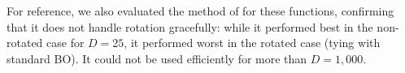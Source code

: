 \documentclass{article}
\begin{document}
For reference, we also evaluated the method of \cite{Chen:2012} for these functions, confirming that it does not handle rotation gracefully: 
while it performed best in the non-rotated case for $D=25$, it performed worst in the rotated case (tying with standard BO). It could not be used efficiently for more than $D=1,000$.
\end{document}

